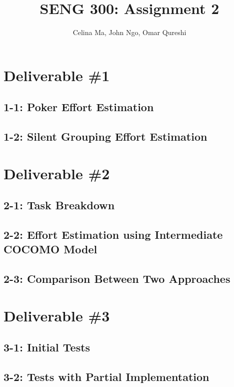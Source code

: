 \documentclass[11pt,a4paper]{article}
\title{\vspace{-2.0cm} \textbf{SENG 300: Assignment 2}}
\author{Celina Ma, John Ngo, Omar Qureshi}
\begin{document}
\maketitle
\def\textfraction{.01}
\def\topfraction{.99}
\section*{Deliverable \#1}

\subsection*{1-1: Poker Effort Estimation}

\subsection*{1-2: Silent Grouping Effort Estimation}

\newpage


\section*{Deliverable \#2}

\subsection*{2-1: Task Breakdown}

\subsection*{2-2: Effort Estimation using Intermediate COCOMO Model}

\subsection*{2-3: Comparison Between Two Approaches}

\newpage

\section*{Deliverable \#3}

\subsection*{3-1: Initial Tests}

\subsection*{3-2: Tests with Partial Implementation}
\end{document}
